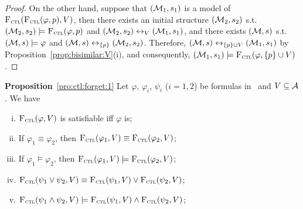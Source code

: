 \documentclass[twoside,11pt]{article}
\begin{document}
\begin{proof}
		On the other hand, suppose that $({\cal M}_1, s_1)$ is a model of ${\textsc{F}_{\textsc{ctl}}}({\textsc{F}_{\textsc{ctl}}}(\varphi, p), V)$, then there exists an initial structure $({\cal M}_2, s_2)$ s.t. $({\cal M}_2, s_2) \models {\textsc{F}_{\textsc{ctl}}}(\varphi, p)$ and $({\cal M}_2, s_2) \leftrightarrow_V ({\cal M}_1, s_1)$, and there exists $({\cal M}, s)$ s.t. $({\cal M}, s) \models \varphi$ and $({\cal M}, s) \leftrightarrow_{\{p\}} ({\cal M}_2, s_2)$. Therefore, $({\cal M}, s) \leftrightarrow_{\{p\} \cup V} ({\cal M}_1, s_1)$ by Proposition~\ref{prop:bisimilar:V}(i), and consequently, $({\cal M}_1, s_1) \models {\textsc{F}_{\textsc{ctl}}}(\varphi, \{p\} \cup V)$.
	\end{proof}
	
	
	
	
	\noindent\textbf{Proposition}~\ref{pro:ctl:forget:1}
	Let $\varphi$, $\varphi_i$, $\psi_i$ ($i=1,2$) be formulas in \CTL\ and $V\subseteq {\cal A}$. We have
	\begin{enumerate}[(i)]
		\item ${\textsc{F}_{\textsc{ctl}}}(\varphi, V)$ is satisfiable iff $\varphi$ is;
		\item If $\varphi_1 \equiv \varphi_2$, then ${\textsc{F}_{\textsc{ctl}}}(\varphi_1, V) \equiv {\textsc{F}_{\textsc{ctl}}}(\varphi_2, V)$;
		\item If $\varphi_1 \models \varphi_2$, then ${\textsc{F}_{\textsc{ctl}}}(\varphi_1, V) \models {\textsc{F}_{\textsc{ctl}}}(\varphi_2, V)$;
		\item ${\textsc{F}_{\textsc{ctl}}}(\psi_1 \vee \psi_2, V) \equiv {\textsc{F}_{\textsc{ctl}}}(\psi_1, V) \vee {\textsc{F}_{\textsc{ctl}}}(\psi_2, V)$;
		\item ${\textsc{F}_{\textsc{ctl}}}(\psi_1 \wedge \psi_2, V) \models {\textsc{F}_{\textsc{ctl}}}(\psi_1, V) \wedge {\textsc{F}_{\textsc{ctl}}}(\psi_2, V)$;
	\end{enumerate}
	
\end{document}

